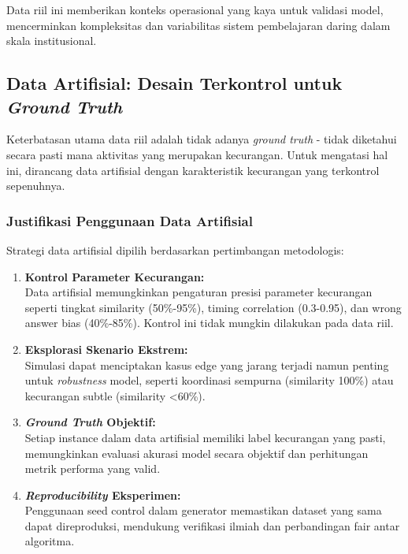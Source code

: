 Data riil ini memberikan konteks operasional yang kaya untuk validasi model, mencerminkan kompleksitas dan variabilitas sistem pembelajaran daring dalam skala institusional.

\subsection{Data Artifisial: Desain Terkontrol untuk \textit{Ground Truth}}
\label{sec:dataArtifisial}

Keterbatasan utama data riil adalah tidak adanya \textit{ground truth} - tidak diketahui secara pasti mana aktivitas yang merupakan kecurangan. Untuk mengatasi hal ini, dirancang data artifisial dengan karakteristik kecurangan yang terkontrol sepenuhnya.

\subsubsection{Justifikasi Penggunaan Data Artifisial}
\label{sec:justifikasiDataArtifisial}

Strategi data artifisial dipilih berdasarkan pertimbangan metodologis:

\begin{enumerate}
    \item \textbf{Kontrol Parameter Kecurangan:} \\
    Data artifisial memungkinkan pengaturan presisi parameter kecurangan seperti tingkat similarity (50\%-95\%), timing correlation (0.3-0.95), dan wrong answer bias (40\%-85\%). Kontrol ini tidak mungkin dilakukan pada data riil.
    
    \item \textbf{Eksplorasi Skenario Ekstrem:} \\
    Simulasi dapat menciptakan kasus edge yang jarang terjadi namun penting untuk \textit{robustness} model, seperti koordinasi sempurna (similarity 100\%) atau kecurangan subtle (similarity <60\%).
    
    \item \textbf{\textit{Ground Truth} Objektif:} \\
    Setiap instance dalam data artifisial memiliki label kecurangan yang pasti, memungkinkan evaluasi akurasi model secara objektif dan perhitungan metrik performa yang valid.
    
    \item \textbf{\textit{Reproducibility} Eksperimen:} \\
    Penggunaan seed control dalam generator memastikan dataset yang sama dapat direproduksi, mendukung verifikasi ilmiah dan perbandingan fair antar algoritma.
\end{enumerate}

